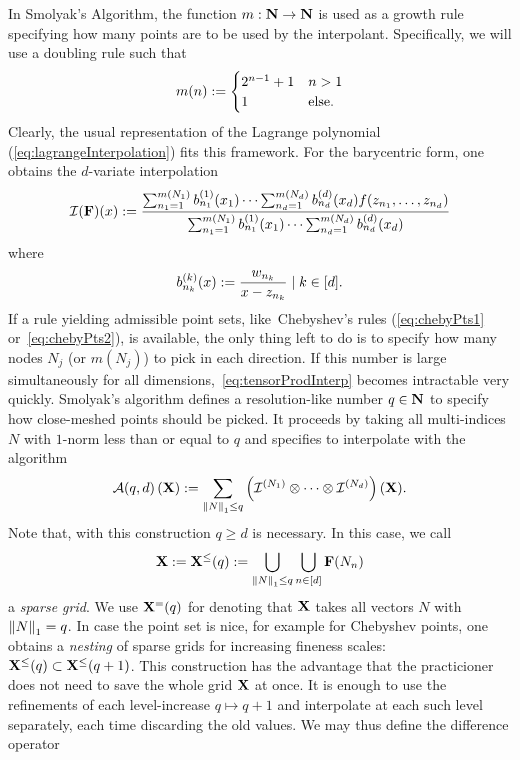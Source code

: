 \documentclass[12pt, oneside]{amsart}
\theoremstyle{definition}
\theoremstyle{remark}
\numberwithin{equation}{section}
\begin{document}
In Smolyak's Algorithm, the function \(m: \N \to \N\) is used as a growth rule specifying how many points are to be used by the interpolant. Specifically, we will use a doubling rule such that \[
    m(n) \defn \begin{cases}
        2^{n-1}+1 &n > 1\\
        1 &\text{else}.
    \end{cases}
\]
Clearly, the usual representation of the Lagrange polynomial (\ref{eq:lagrangeInterpolation}) fits this framework. For the barycentric form, one obtains the \(d\)-variate interpolation
\begin{equation}\label{eq:multivarBarycentric}
    \cI(\FF)(x) \defn \frac{\sum_{n_1=1}^{m(N_1)} b^{(1)}_{n_1}(x_1) \cdots \sum_{n_d=1}^{m(N_d)}b^{(d)}_{n_d}(x_d) f(z_{n_1}, \dots, z_{n_d})}{\sum_{n_1=1}^{m(N_1)} b^{(1)}_{n_1}(x_1) \cdots \sum_{n_d=1}^{m(N_d)}b^{(d)}_{n_d}(x_d)}
\end{equation}
where
\begin{equation}\label{eq:barycentricBasis}
    b^{(k)}_{n_k}(x) \defn \frac{w_{n_k}}{x-z_{n_k}} \mid k \in [d].
\end{equation}
If a rule yielding admissible point sets, like\ Chebyshev's rules (\ref{eq:chebyPts1} or\ \ref{eq:chebyPts2}), is available, the only thing left to do is to specify how many nodes \(N_j\) (or \(m(N_j)\)) to pick in each direction. If this number is large simultaneously for all dimensions,\ \cref{eq:tensorProdInterp} becomes intractable very quickly. Smolyak's algorithm defines a resolution-like number \(q \in \N\) to specify how close-meshed points should be picked. It proceeds by taking all multi-indices \(N\) with \(1\)-norm less than or equal to \(q\) and specifies to interpolate with the algorithm
\begin{equation}\label{eq:smolyak}
    \cA(q, d)\left(\XX\right) \defn \sum_{\norm[1]{N} \leq q} \left(\cI^{(N_1)} \otimes \cdots \otimes \cI^{(N_d)}\right)(\XX).
\end{equation}
Note that, with this construction \(q \geq d\) is necessary. In this case, we call
\begin{equation}\label{eq:sparseGrid}
    \XX \defn \XX^{\leq}(q) \defn \bigcup_{\norm[1]{N} \leq q} \bigcup_{n \in [d]} \FF(N_n)
\end{equation}
a \emph{sparse grid}. We use \(\XX^=(q)\) for denoting that \(\XX\) takes all vectors \(N\) with \(\norm[1]{N}=q\). In case the point set is nice, for example for Chebyshev points, one obtains a \emph{nesting} of sparse grids for increasing fineness scales: \(\XX^\leq(q) \subset \XX^\leq(q+1)\). This construction has the advantage that the practicioner does not need to save the whole grid \(\XX\) at once. It is enough to use the refinements of each level-increase \(q \mapsto q+1\) and interpolate at each such level separately, each time discarding the old values. We may thus define the difference operator
\end{document}
